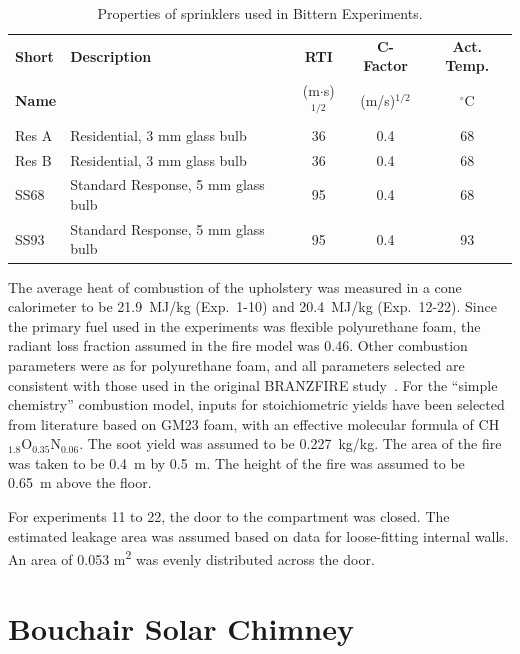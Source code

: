 \begin{table}[!ht]
\centering
\caption[Properties of sprinklers used in Bittern Experiments]{Properties of sprinklers used in Bittern Experiments.}
\label{Bittern_Sprinklers}
\begin{tabular}{|l|l|c|c|c|}
\hline
\textbf{Short} & \textbf{Description}                & \textbf{RTI}        & \textbf{C-Factor} & \textbf{Act. Temp.} \\
\textbf{Name}  &                                     & (m$\cdot$s)$^{1/2}$ & (m/s)$^{1/2}$     & $^\circ$C           \\ \hline
Res A          & Residential, 3 mm glass bulb        & 36                  & 0.4               & 68                  \\ \hline
Res B          & Residential, 3 mm glass bulb        & 36                  & 0.4               & 68                  \\ \hline
SS68           & Standard Response, 5 mm glass bulb  & 95                  & 0.4               & 68                  \\ \hline
SS93           & Standard Response, 5 mm glass bulb  & 95                  & 0.4               & 93                  \\ \hline
\end{tabular}
\end{table}

The average heat of combustion of the upholstery was measured in a cone calorimeter to be 21.9~MJ/kg (Exp.~1-10) and 20.4~MJ/kg (Exp.~12-22). Since the primary fuel used in the experiments was flexible polyurethane foam, the radiant loss fraction assumed in the fire model was 0.46. Other combustion parameters were as for polyurethane foam, and all parameters selected are consistent with those used in the original BRANZFIRE study~\cite{Wade:FT2007}. For the ``simple chemistry'' combustion model, inputs for stoichiometric yields have been selected from literature based on GM23 foam, with an effective molecular formula of CH$_{1.8}$O$_{0.35}$N$_{0.06}$. The soot yield was assumed to be 0.227~kg/kg. The area of the fire was taken to be 0.4~m by 0.5~m. The height of the fire was assumed to be 0.65~m above the floor.

For experiments 11 to 22, the door to the compartment was closed. The estimated leakage area was assumed based on data for loose-fitting internal walls. An area of 0.053 m\textsuperscript{2} was evenly distributed across the door.


\section{Bouchair Solar Chimney}
\label{Bouchair_Solar_Chimney_Description}


